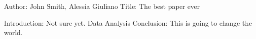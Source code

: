 Author: John Smith, Alessia Giuliano
Title: The best paper ever

Introduction: Not sure yet.
Data
Analysis
Conclusion: This is going to change the world.